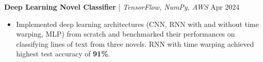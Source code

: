 \textbf{Deep Learning Novel Classifier} | \textit{TensorFlow, NumPy, AWS} \hfill Apr 2024 \par
\begin{itemize}
	\item Implemented deep learning architectures (CNN, RNN with and without time warping, MLP) from scratch and benchmarked their performances on classifying lines of text from three novels. RNN with time warping achieved highest test accuracy of \textbf{91\%}.
\end{itemize}

